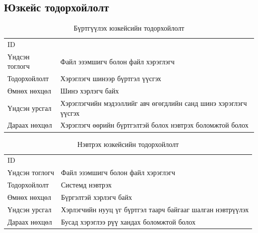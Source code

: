 \subsection*{Юзкейс тодорхойлолт}
\begin{table}[H]
    \label{tab:treatments}
    \footnotesize
    \centering
    \begin{tabularx}{\textwidth}{|>{\hsize=0.3\hsize}X|>{\hsize=0.7\hsize}X|}
        \hline
        \multicolumn{2}{|c|}{Бүртгүүлэх}                                                  \\
        \hline
        ID& 1\\
        \hline
        Үндсэн тоглогч & Файл эзэмшигч болон файл хэрэглэгч\\
        \hline
        Тодорхойлолт   & Хэрэглэгч шинээр бүртгэл үүсгэх                                  \\
        \hline
        Өмнөх нөхцөл   & Шинэ хэрлэгч байх                                                \\
        \hline
        Үндсэн урсгал  & Хэрэглэгчийн мэдээллийг авч өгөгдлийн санд шинэ хэрэглэгч үүсгэх \\
        \hline
        Дараах нөхцөл  & Хэрэглэгч өөрийн бүртгэлтэй болох нэвтрэх боломжтой болох        \\
        \hline
    \end{tabularx}
    \caption{Бүртгүүлэх юзкейсийн тодорхойлолт}
\end{table}

\begin{table}[H]
    \footnotesize
    \centering
    \begin{tabularx}{\textwidth}{|>{\hsize=0.3\hsize}X|>{\hsize=0.7\hsize}X|}
        \hline
        \multicolumn{2}{|c|}{Нэвтрэх}                                               \\
        \hline
        ID             & 2                                                          \\
        \hline
        Үндсэн тоглогч & Файл эзэмшигч болон файл хэрэглэгч                         \\
        \hline
        Тодорхойлолт   & Системд нэвтрэх                                            \\
        \hline
        Өмнөх нөхцөл   & Бүргэлтэй хэрлэгч байх                                     \\
        \hline
        Үндсэн урсгал  & Хэрлэгчийн нууц үг бүртгэл таарч байгааг шалган нэвтрүүлэх \\
        \hline
        Дараах нөхцөл  & Бусад хэрэглээ рүү хандах боломжтой болох                  \\
        \hline
    \end{tabularx}
    \caption{Нэвтрэх юзкейсийн тодорхойлолт}
\end{table}

